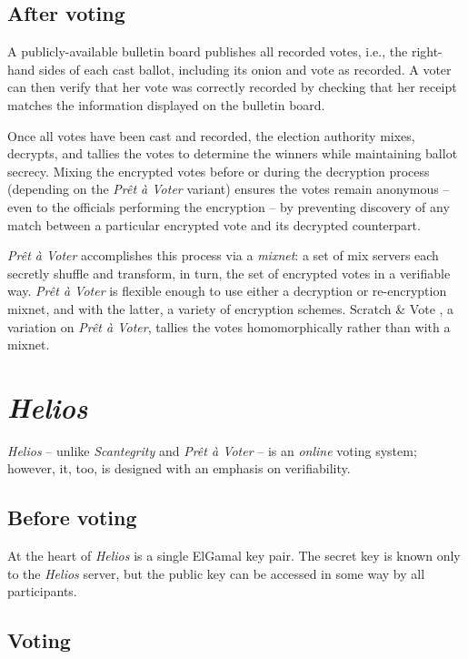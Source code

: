\documentclass[10pt,twocolumn]{article}
\newcommand{\term}[1]{\textit{#1}}
\newcommand{\preta}{Pr\^{e}t \`{a}}
\newcommand{\pv}{\preta{} Voter}
\begin{document}
\subsection{After voting}
A publicly-available bulletin board publishes all recorded votes, i.e., the right-hand sides of each cast ballot, including its onion and vote as recorded.
A voter can then verify that her vote was correctly recorded by checking that her receipt matches the information displayed on the bulletin board.

Once all votes have been cast and recorded, the election authority mixes, decrypts, and tallies the votes to determine the winners while maintaining ballot secrecy.
Mixing the encrypted votes before or during the decryption process (depending on the \term{\pv{}} variant) ensures the votes remain anonymous -- even to the officials performing the encryption -- by preventing discovery of any match between a particular encrypted vote and its decrypted counterpart.

\term{\pv{}} accomplishes this process via a \term{mixnet}: a set of mix servers each secretly shuffle and transform, in turn, the set of encrypted votes in a verifiable way.
\term{\pv{}} is flexible enough to use either a decryption or re-encryption mixnet, and with the latter, a variety of encryption schemes.
Scratch \& Vote \cite{scratch}, a variation on \term{\pv}, tallies the votes homomorphically rather than with a mixnet.

\section{\term{Helios}}

\term{Helios} \cite{helios} -- unlike \term{Scantegrity} and \term{\pv{}} -- is an \emph{online} voting
system; however, it, too, is designed with an emphasis on verifiability.

\subsection{Before voting}

At the heart of \term{Helios} is a single ElGamal key pair. The secret key is known only to the \term{Helios}
server, but the public key can be accessed in some way by all participants.

\subsection{Voting}
\end{document}
